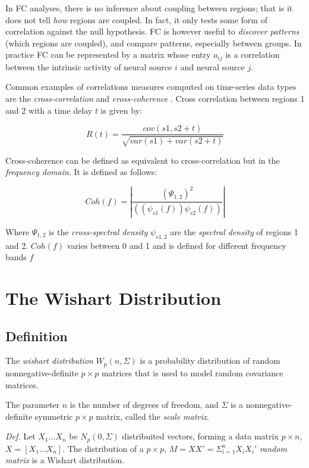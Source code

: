 \documentclass[12pt,openright,twoside,a4paper]{book}
\begin{document}
In FC analyses, there is no inference about coupling between regions; that is it does not tell \textit{how} regions are coupled.
In fact, it only tests some form of correlation against the null hypothesis.
FC is however useful to \textit{discover patterns} (which regions are coupled), and compare patterns, especially between groups.
In practice FC can be represented by a matrix whose entry $a_{ij}$ is a correlation between the intrinsic activity of neural source $i$ and neural source $j$.

Common examples of correlations measures computed on time-series data types are the \textit{cross-correlation} and \textit{cross-coherence} \cite{connect}.
Cross correlation between regions 1 and 2 with a time delay $t$ is given by:

\begin{equation}
R(t)= \frac{cov(s1,s2+t)}{\sqrt{var(s1)+var(s2+t)}}
\end{equation}

Cross-coherence can be defined as equivalent to cross-correlation but in the \textit{frequency domain}. It is defined as follows:

\begin{equation}
Coh(f) = | \frac{(\Psi_{1,2})^2}  {((\psi_{s1}(f))\psi_{s2}(f))} |
\end{equation}

Where $\Psi_{1,2}$ is the \textit{cross-spectral density} $\psi_{s1,2}$ are the \textit{spectral density} of regions 1 and 2. $Coh(f)$ varies between 0 and 1 and is defined for different frequency bands $f$

\chapter{The Wishart Distribution}

\section{Definition}

The \textit{wishart distribution} $ W_p(n, \Sigma)$ is a probability distribution of random nonnegative-definite $p\times p$ matrices that is used to model random covariance matrices.

The parameter $n$ is the number of degrees of freedom, and $\Sigma$ is a nonnegative-definite symmetric $p\times p$ matrix, called the \textit{scale matrix}.


\textit{Def.} Let $X_1...X_n$ be $N_p(0,\Sigma)$ distribuited vectors, forming a data matrix $p\times n$, $X=[X_1...X_n]$.
The distribution of  a $p\times p$, $M=XX'=\Sigma^n_{i=1}X_iX_i'$ \textit{random matrix}  is a Wishart distribution. \cite{AMS}
\end{document}
